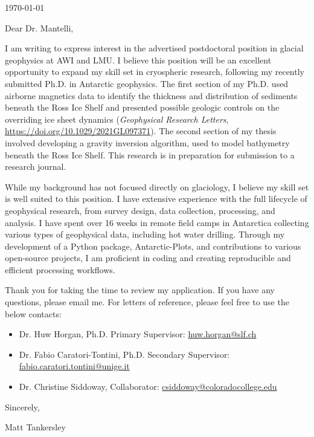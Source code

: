 \documentclass{ExpressiveCoverLetter}
\begin{document}
\coverletterheader[
    firstname=Matthew,
    middleinitial=D,
    lastname=Tankersley,
    email=matt.d.tankersley@gmail.com,
    linkedin=matthew-tankersley,
    github=mdtanker,
]
\vspace{-0.1in}
\today


Dear Dr. Mantelli,

I am writing to express interest in the advertised postdoctoral
position in glacial geophysics at AWI and LMU. I believe this position will be an excellent
opportunity to expand my skill set in cryospheric research, following my
recently submitted Ph.D. in Antarctic geophysics. The first section of my Ph.D. used airborne magnetics data to identify
the thickness and distribution of sediments beneath the Ross Ice Shelf and
presented possible geologic controls on the overriding ice sheet
dynamics (\textit{Geophysical
    Research Letters}, \url{https://doi.org/10.1029/2021GL097371}). The second section of my thesis involved developing a gravity
inversion algorithm, used to model bathymetry beneath
the Ross Ice Shelf. This research is in preparation for submission to a
research journal.

While my background has not focused directly on glaciology, I believe my
skill set is well suited to this position. I have extensive experience
with the full lifecycle of geophysical research, from survey design,
data collection, processing, and analysis. I have
spent over 16 weeks in remote field camps in Antarctica collecting
various types of geophysical data, including hot water drilling. Through my development of a Python
package, Antarctic-Plots, and contributions to various open-source
projects, I am proficient in coding and creating reproducible and
efficient processing workflows.

Thank you for taking the time to review my application. If you have any
questions, please email me.
For letters of reference, please feel free to use the below contacts:
\begin{itemize}
    \item Dr. Huw Horgan, Ph.D. Primary Supervisor: \href{mailto:huw.horgan@slf.ch}{huw.horgan@slf.ch}
    \item Dr. Fabio Caratori-Tontini, Ph.D. Secondary Supervisor: \href{mailto:fabio.caratori.tontini@unige.it}{fabio.caratori.tontini@unige.it}
    \item Dr. Christine Siddoway, Collaborator: \href{mailto:csiddoway@coloradocollege.edu}{csiddoway@coloradocollege.edu}
\end{itemize}


Sincerely,

\vspace{.2in}

Matt Tankersley
\end{document}
